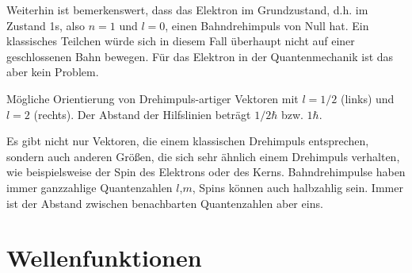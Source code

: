 Weiterhin ist bemerkenswert, dass das Elektron im Grundzustand, d.h. im Zustand 1s, also $n=1$ und $l=0$, einen Bahndrehimpuls von Null hat. Ein klassisches Teilchen würde sich in diesem Fall überhaupt nicht auf einer geschlossenen Bahn bewegen. Für das Elektron in der Quantenmechanik ist das aber kein Problem.

\begin{marginfigure}
    \caption{Mögliche Orientierung von  Drehimpuls-artiger Vektoren mit $l=1/2$ (links) und $l=2$ (rechts). Der Abstand der Hilfslinien beträgt $1/2 \hbar$ bzw. $1\hbar$.}
\end{marginfigure}

Es gibt nicht nur Vektoren, die einem klassischen Drehimpuls entsprechen, sondern auch anderen Größen, die sich sehr ähnlich einem Drehimpuls verhalten, wie beispielsweise der Spin des Elektrons oder des Kerns. Bahndrehimpulse haben immer ganzzahlige Quantenzahlen $l$,$m$, Spins können auch halbzahlig sein. Immer ist der Abstand zwischen benachbarten Quantenzahlen aber eins. 



\section{Wellenfunktionen}

